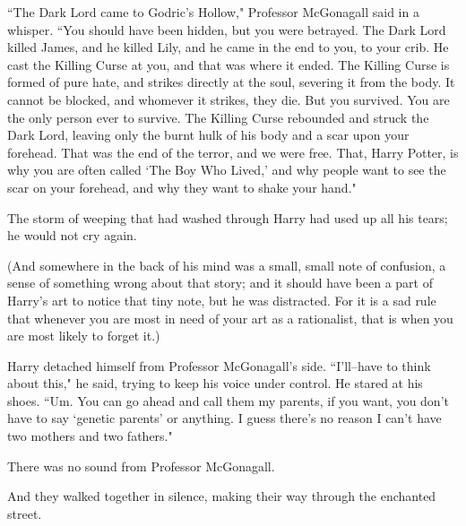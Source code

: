 ``The Dark Lord came to Godric's Hollow," Professor McGonagall said in a whisper. ``You should have been hidden, but you were betrayed. The Dark Lord killed James, and he killed Lily, and he came in the end to you, to your crib. He cast the Killing Curse at you, and that was where it ended. The Killing Curse is formed of pure hate, and strikes directly at the soul, severing it from the body. It cannot be blocked, and whomever it strikes, they die. But you survived. You are the only person ever to survive. The Killing Curse rebounded and struck the Dark Lord, leaving only the burnt hulk of his body and a scar upon your forehead. That was the end of the terror, and we were free. That, Harry Potter, is why you are often called `The Boy Who Lived,' and why people want to see the scar on your forehead, and why they want to shake your hand."

The storm of weeping that had washed through Harry had used up all his tears; he would not cry again.

(And somewhere in the back of his mind was a small, small note of confusion, a sense of something wrong about that story; and it should have been a part of Harry's art to notice that tiny note, but he was distracted. For it is a sad rule that whenever you are most in need of your art as a rationalist, that is when you are most likely to forget it.)

Harry detached himself from Professor McGonagall's side. ``I'll\---have to think about this," he said, trying to keep his voice under control. He stared at his shoes. ``Um. You can go ahead and call them my parents, if you want, you don't have to say `genetic parents' or anything. I guess there's no reason I can't have two mothers and two fathers."

There was no sound from Professor McGonagall.

And they walked together in silence, making their way through the enchanted street.

